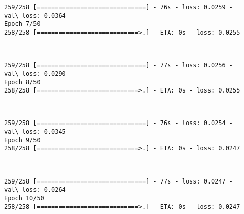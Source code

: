 \documentclass[11pt]{article}
\begin{document}
    \begin{Verbatim}[commandchars=\\\{\}]
259/258 [==============================] - 76s - loss: 0.0259 - val\_loss: 0.0364
Epoch 7/50
258/258 [============================>.] - ETA: 0s - loss: 0.0255
    \end{Verbatim}

    \begin{center}
    \end{center}
    { \hspace*{\fill} \\}
    
    \begin{Verbatim}[commandchars=\\\{\}]
259/258 [==============================] - 77s - loss: 0.0256 - val\_loss: 0.0290
Epoch 8/50
258/258 [============================>.] - ETA: 0s - loss: 0.0255
    \end{Verbatim}

    \begin{center}
    \end{center}
    { \hspace*{\fill} \\}
    
    \begin{Verbatim}[commandchars=\\\{\}]
259/258 [==============================] - 76s - loss: 0.0254 - val\_loss: 0.0345
Epoch 9/50
258/258 [============================>.] - ETA: 0s - loss: 0.0247
    \end{Verbatim}

    \begin{center}
    \end{center}
    { \hspace*{\fill} \\}
    
    \begin{Verbatim}[commandchars=\\\{\}]
259/258 [==============================] - 77s - loss: 0.0247 - val\_loss: 0.0264
Epoch 10/50
258/258 [============================>.] - ETA: 0s - loss: 0.0247
    \end{Verbatim}

    \begin{center}
    \end{center}
    { \hspace*{\fill} \\}
    
\end{document}

